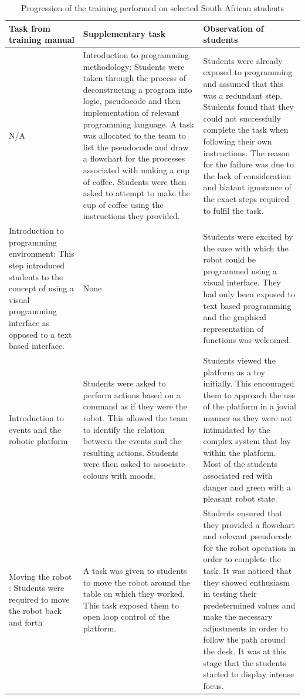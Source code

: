 \documentclass{intech-journal}
\begin{document}
\begin{table}
\centering
\caption{Progression of the training performed on selected South African students}
\begin{tabular}{|p{5cm}|p{5cm}|p{5cm}|} \hline
Task from training manual & Supplementary task & Observation of students \\\hline
N/A &  Introduction to programming methodology: Students were taken through the process of deconstructing a program into logic, pseudocode and then implementation of relevant programming language. A task was allocated to the team to list the pseudocode and draw a flowchart for the processes associated with making a cup of coffee. Students were then asked to attempt to make the cup of coffee using the instructions they provided. &
Students were already exposed to programming and assumed that this was a redundant step. Students found that they could not successfully complete the task when following their own instructions. The reason for the failure was due to the lack of consideration and blatant ignorance of the exact steps required to fulfil the task. \\\hline
Introduction to programming environment: This step introduced students to the concept of using a visual programming interface as opposed to a text based interface.  &
None &
Students were excited by the ease with which the robot could be programmed using a visual interface. They had only been exposed to text based programming and the graphical representation of functions was welcomed. \\\hline
Introduction to events and the robotic platform &
Students were asked to perform actions based on a command as if they were the robot. This allowed the team to identify the relation between the events and the resulting actions. Students were then asked to associate colours with moods. &
Students viewed the platform as a toy initially. This encouraged them to approach the use of the platform in a jovial manner as they were not intimidated by the complex system that lay within the platform. Most of the students associated red with danger and green with a pleasant robot state.  \\\hline
Moving the robot : Students were required to move the robot back and forth &
A task was given to students to move the robot around the table on which they worked. This task exposed them to open loop control of the platform. &
Students ensured that they provided a flowchart and relevant pseudocode for the robot operation in order to complete the task. It was noticed that they showed enthusiasm in testing their predetermined values and make the necessary adjustments in order to follow the path around the desk. It was at this stage that the students started to display intense focus. \\\hline

\end{tabular}
\end{table}
\end{document}
